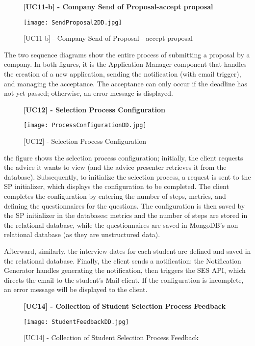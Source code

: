 			\begin{figure}[H]
			\centering
			{\bfseries [UC11-b] - Company Send of Proposal-accept proposal}
			\caption{[UC11-b] - Company Send of Proposal - accept proposal}
			\texttt{[image: SendProposal2DD.jpg]}
			
		\end{figure}
		
		
		
		The two sequence diagrams show the entire process of submitting a proposal by a company. In both figures, it is the Application Manager component that handles the creation of a new application, sending the notification (with email trigger), and managing the acceptance. The acceptance can only occur if the deadline has not yet passed; otherwise, an error message is displayed.
		
		
		
		
		
		
		
		\begin{figure}[H]
			\centering
			{\bfseries [UC12] - Selection Process Configuration}
			\caption{[UC12] - Selection Process Configuration}
			\texttt{[image: ProcessConfigurationDD.jpg]}
			
		\end{figure}
		
		
		the figure shows the selection process configuration; initially, the client requests the advice it wants to view (and the advice presenter retrieves it from the database). Subsequently, to initialize the selection process, a request is sent to the SP initializer, which displays the configuration to be completed. The client completes the configuration by entering the number of steps, metrics, and defining the questionnaires for the questions. The configuration is then saved by the SP initializer in the databases: metrics and the number of steps are stored in the relational database, while the questionnaires are saved in MongoDB’s non-relational database (as they are unstructured data).
		
		Afterward, similarly, the interview dates for each student are defined and saved in the relational database. Finally, the client sends a notification: the Notification Generator handles generating the notification, then triggers the SES API, which directs the email to the student's Mail client. If the configuration is incomplete, an error message will be displayed to the client.
		
		
		\begin{figure}[H]
			\centering
			{\bfseries [UC14] - Collection of Student Selection Process Feedback}
			\caption{[UC14] - Collection of Student Selection Process Feedback}
			\texttt{[image: StudentFeedbackDD.jpg]}
		\end{figure}
		
